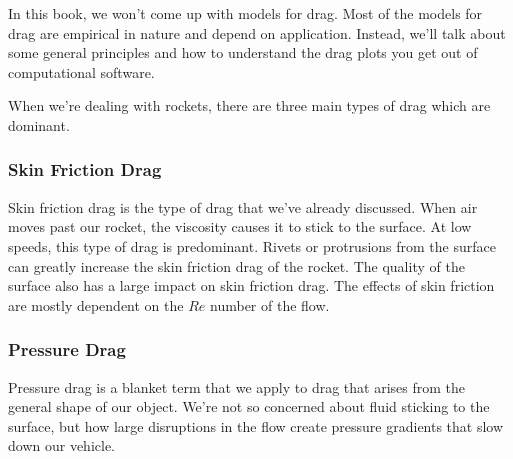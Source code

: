 \documentclass[10pt, openany, titlepage]{book}
\theoremstyle{definition}
\begin{document}
In this book, we won't come up with models for drag. Most of the models for drag are empirical in nature and depend on application. Instead, we'll talk about some general principles and how to understand the drag plots you get out of computational software.

When we're dealing with rockets, there are three main types of drag which are dominant. 

\subsubsection{Skin Friction Drag}
Skin friction drag is the type of drag that we've already discussed. When air moves past our rocket, the viscosity causes it to stick to the surface. At low speeds, this type of drag is predominant. Rivets or protrusions from the surface can greatly increase the skin friction drag of the rocket. The quality of the surface also has a large impact on skin friction drag. The effects of skin friction are mostly dependent on the $Re$ number of the flow.

\subsubsection{Pressure Drag}
Pressure drag is a blanket term that we apply to drag that arises from the general shape of our object. We're not so concerned about fluid sticking to the surface, but how large disruptions in the flow create pressure gradients that slow down our vehicle.
\end{document}
